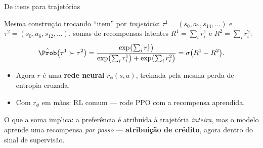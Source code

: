 \documentclass[aspectratio=169, 11pt]{beamer}
\newcommand{\rphi}{r_{\phi}}                     %
\newcommand{\traj}{\tau}
\newcommand{\sig}{\sigma}
\begin{document}
\begin{frame}{De itens para trajetórias}

  Mesma construção trocando ``item'' por \emph{trajetória}: $\traj^1 =
  (s_0, a_7, s_{14},\dots)$ e $\traj^2 = (s_0, a_6, s_{12},\dots)$, somas de
  recompensas latentes $R^1 = \sum_{i} r^1_i$ e $R^2 = \sum_i r^2_i$:
  \[
    \hat{\Prob}\bigl(\traj^1 \succ \traj^2\bigr)
      = \frac{\exp\bigl(\sum_i r^1_i\bigr)}
             {\exp\bigl(\sum_i r^1_i\bigr) + \exp\bigl(\sum_i r^2_i\bigr)}
      = \sig\bigl(R^1 - R^2\bigr).
  \]

  \begin{itemize}\setlength{\itemsep}{0.3ex}
    \item Agora $r$ é uma \textbf{rede neural} $\rphi(s,a)$, treinada pela
      mesma perda de entropia cruzada.
    \item Com $\rphi$ em mãos: RL comum --- rode PPO com a recompensa
      aprendida.
  \end{itemize}

  \begin{alertabox}
    O que a soma implica: a preferência é atribuída à trajetória \emph{inteira},
    mas o modelo aprende uma recompensa \emph{por passo} --- \textbf{atribuição
    de crédito}, agora dentro do sinal de supervisão.
  \end{alertabox}
\end{frame}
\end{document}
